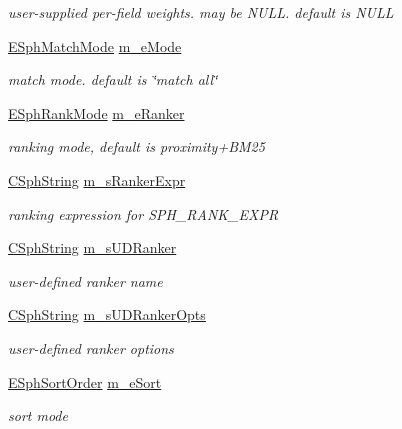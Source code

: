 \begin{DoxyCompactItemize}
\begin{DoxyCompactList}\small\item\em user-\/supplied per-\/field weights. may be N\-U\-L\-L. default is N\-U\-L\-L \end{DoxyCompactList}\item 
\hyperlink{sphinx_8h_a979560e74394b50176bf50ce8ff238d1}{E\-Sph\-Match\-Mode} \hyperlink{classCSphQuery_a4bcc406daa74d2db796cfece980cad0e}{m\-\_\-e\-Mode}
\begin{DoxyCompactList}\small\item\em match mode. default is \char`\"{}match all\char`\"{} \end{DoxyCompactList}\item 
\hyperlink{sphinx_8h_a1561ec7d12bb80bd0262ef55184578b2}{E\-Sph\-Rank\-Mode} \hyperlink{classCSphQuery_aeecfd9ad18482d811bc30c38cc45a1b7}{m\-\_\-e\-Ranker}
\begin{DoxyCompactList}\small\item\em ranking mode, default is proximity+\-B\-M25 \end{DoxyCompactList}\item 
\hyperlink{structCSphString}{C\-Sph\-String} \hyperlink{classCSphQuery_adafccf145800d5cd305aa38023ba22e5}{m\-\_\-s\-Ranker\-Expr}
\begin{DoxyCompactList}\small\item\em ranking expression for S\-P\-H\-\_\-\-R\-A\-N\-K\-\_\-\-E\-X\-P\-R \end{DoxyCompactList}\item 
\hyperlink{structCSphString}{C\-Sph\-String} \hyperlink{classCSphQuery_a2bc7044d50dffe9b164caf1b92ea904c}{m\-\_\-s\-U\-D\-Ranker}
\begin{DoxyCompactList}\small\item\em user-\/defined ranker name \end{DoxyCompactList}\item 
\hyperlink{structCSphString}{C\-Sph\-String} \hyperlink{classCSphQuery_a1a8713b8e60edf27647a37890c4637ff}{m\-\_\-s\-U\-D\-Ranker\-Opts}
\begin{DoxyCompactList}\small\item\em user-\/defined ranker options \end{DoxyCompactList}\item 
\hyperlink{sphinx_8h_ae1a4167bd63e8760850a5df3e36eb0a8}{E\-Sph\-Sort\-Order} \hyperlink{classCSphQuery_a2da4282d6340a2a90b3c6d19ef439e90}{m\-\_\-e\-Sort}
\begin{DoxyCompactList}\small\item\em sort mode \end{DoxyCompactList}\item 

\end{DoxyCompactItemize}

